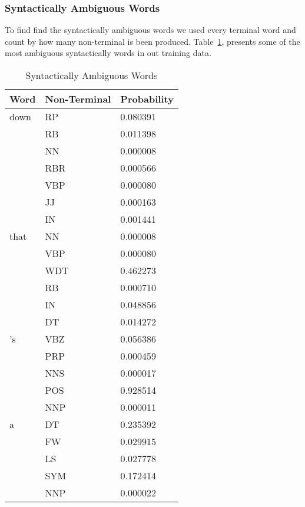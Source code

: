 \documentclass[a4paper,11pt]{article}
\begin{document}
\subsubsection{Syntactically Ambiguous Words}
To find find the syntactically ambiguous words we used every terminal word and count by how many non-terminal is been produced. Table~\ref{syn}, presents some of the most ambiguous syntactically words in out training data.
\begin{table}[t!]
\label{unknown}
\caption{Syntactically Ambiguous Words}
\label{syn}
\begin{center}
\begin{tiny}
    \begin{tabular}{l l l}
    \hline
    \hline
        \textbf{Word} & \textbf{Non-Terminal} & \textbf{Probability} \\ \hline
down  &  RP  &  0.080391  \\
  &  RB  &  0.011398  \\
  &  NN  &  0.000008  \\
  &  RBR  &  0.000566  \\
  &  VBP  &  0.000080  \\
  &  JJ  &  0.000163  \\
  &  IN  &  0.001441  \vspace{0.1cm} \\
that  &  NN  &  0.000008  \\
  &  VBP  &  0.000080  \\
  &  WDT  &  0.462273  \\
  &  RB  &  0.000710  \\
  &  IN  &  0.048856  \\
  &  DT  &  0.014272  \vspace{0.1cm} \\
's  &  VBZ  &  0.056386  \\
  &  PRP  &  0.000459  \\
  &  NNS  &  0.000017  \\
  &  POS  &  0.928514  \\
  &  NNP  &  0.000011  \vspace{0.1cm} \\
a  &  DT  &  0.235392  \\
  &  FW  &  0.029915  \\
  &  LS  &  0.027778  \\
  &  SYM  &  0.172414  \\
  &  NNP  &  0.000022  \\
  \hline
  \end{tabular}
  \end{tiny}
  \end{center}
\end{table}
\end{document}
